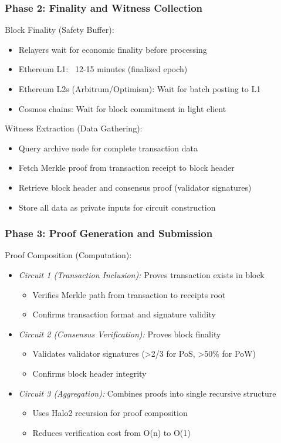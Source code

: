 \documentclass[11pt,a4paper]{article}
\begin{document}
\subsubsection*{Phase 2: Finality and Witness Collection}

Block Finality (Safety Buffer):
\begin{itemize}
    \item Relayers wait for economic finality before processing
    \item Ethereum L1: ~12-15 minutes (finalized epoch)
    \item Ethereum L2s (Arbitrum/Optimism): Wait for batch posting to L1
    \item Cosmos chains: Wait for block commitment in light client
\end{itemize}

Witness Extraction (Data Gathering):
\begin{itemize}
    \item Query archive node for complete transaction data
    \item Fetch Merkle proof from transaction receipt to block header
    \item Retrieve block header and consensus proof (validator signatures)
    \item Store all data as private inputs for circuit construction
\end{itemize}

\subsubsection*{Phase 3: Proof Generation and Submission}

Proof Composition (Computation):
\begin{itemize}
    \item \textit{Circuit 1 (Transaction Inclusion):} Proves transaction exists in block
        \begin{itemize}
            \item Verifies Merkle path from transaction to receipts root
            \item Confirms transaction format and signature validity
        \end{itemize}
    \item \textit{Circuit 2 (Consensus Verification):} Proves block finality
        \begin{itemize}
            \item Validates validator signatures (>2/3 for PoS, >50\% for PoW)
            \item Confirms block header integrity
        \end{itemize}
    \item \textit{Circuit 3 (Aggregation):} Combines proofs into single recursive structure
        \begin{itemize}
            \item Uses Halo2 recursion for proof composition
            \item Reduces verification cost from O(n) to O(1)
        \end{itemize}
\end{itemize}
\end{document}
